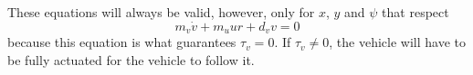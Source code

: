 \par These equations will always be valid, however, only for $x$, $y$ and $\psi$ that respect
\begin{equation}
    m_v \dot{v} + m_u u r + d_v v = 0
    \label{eq:onlymandatoryconstraint}
\end{equation}
because this equation is what guarantees $\tau_v = 0$. If $\tau_v \neq 0$, the vehicle will have to be fully actuated for the vehicle to follow it.

